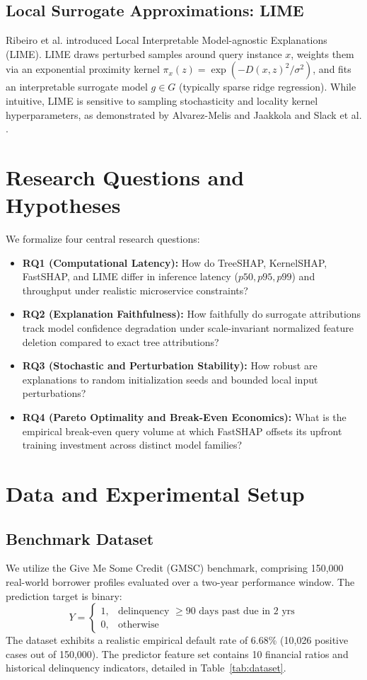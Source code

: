 \documentclass[conference]{IEEEtran}
\begin{document}
\subsection{Local Surrogate Approximations: LIME}
Ribeiro et al. \cite{ribeiro2016why} introduced Local Interpretable Model-agnostic Explanations (LIME). LIME draws perturbed samples around query instance $x$, weights them via an exponential proximity kernel $\pi_x(z) = \exp(-D(x,z)^2/\sigma^2)$, and fits an interpretable surrogate model $g \in G$ (typically sparse ridge regression). While intuitive, LIME is sensitive to sampling stochasticity and locality kernel hyperparameters, as demonstrated by Alvarez-Melis and Jaakkola \cite{alvarezmelis2018robustness} and Slack et al. \cite{slack2020fooling}.

\section{Research Questions and Hypotheses}
We formalize four central research questions:
\begin{itemize}
    \item \textbf{RQ1 (Computational Latency):} How do TreeSHAP, KernelSHAP, FastSHAP, and LIME differ in inference latency ($p50, p95, p99$) and throughput under realistic microservice constraints?
    \item \textbf{RQ2 (Explanation Faithfulness):} How faithfully do surrogate attributions track model confidence degradation under scale-invariant normalized feature deletion compared to exact tree attributions?
    \item \textbf{RQ3 (Stochastic and Perturbation Stability):} How robust are explanations to random initialization seeds and bounded local input perturbations?
    \item \textbf{RQ4 (Pareto Optimality and Break-Even Economics):} What is the empirical break-even query volume at which FastSHAP offsets its upfront training investment across distinct model families?
\end{itemize}

\section{Data and Experimental Setup}
\subsection{Benchmark Dataset}
We utilize the Give Me Some Credit (GMSC) benchmark, comprising 150,000 real-world borrower profiles evaluated over a two-year performance window. The prediction target is binary:
\begin{equation}
Y = 
\begin{cases}
1, & \text{delinquency $\ge 90$ days past due in 2 yrs} \\
0, & \text{otherwise}
\end{cases}
\end{equation}
The dataset exhibits a realistic empirical default rate of 6.68\% (10,026 positive cases out of 150,000). The predictor feature set contains 10 financial ratios and historical delinquency indicators, detailed in Table~\ref{tab:dataset}.
\end{document}
